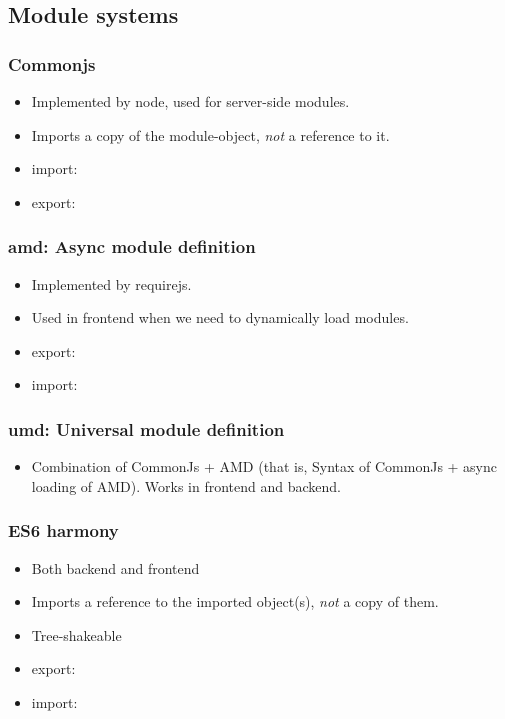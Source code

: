 \subsection{Module systems}

\subsubsection{Commonjs}
\begin{itemize}
  \item Implemented by node, used for server-side modules. 
  \item Imports a copy of the module-object, \emph{not} a reference to it.
  \item import: 
  \item export: 
\end{itemize}

\subsubsection{amd: Async module definition}
\begin{itemize}
  \item Implemented by requirejs.
  \item Used in frontend when we need to dynamically load modules. 
  \item export: 
  \item import: 
\end{itemize}

\subsubsection{umd: Universal module definition}
\begin{itemize}
  \item Combination of CommonJs + AMD (that is, Syntax of CommonJs + async loading of AMD). Works in frontend and backend.
\end{itemize}

\subsubsection{ES6 harmony}
\begin{itemize}
  \item Both backend and frontend
  \item Imports a reference to the imported object(s), \emph{not} a copy of them.
  \item Tree-shakeable
  \item export: 
  \item import: 
\end{itemize}

